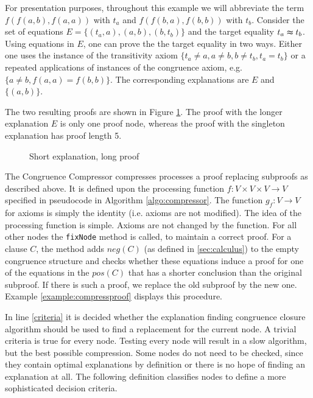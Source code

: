
\begin{example}
\label{example:shortexpl}
For presentation purposes, throughout this example we will abbreviate the term $f(f(a,b),f(a,a))$ with $t_a$ and $f(f(b,a),f(b,b))$ with $t_b$.
Consider the set of equations $E = \{(t_a,a),(a,b),(b,t_b)\}$ and the target equality $t_a \thickapprox t_b$.
Using equations in $E$, one can prove the the target equality in two ways.
Either one uses the instance of the transitivity axiom $\{t_a \neq a, a \neq b, b \neq t_b, t_a = t_b\}$ or a repeated applications of instances of the congruence axiom, e.g. $\{a \neq b, f(a,a) = f(b,b)\}$.
The corresponding explanations are $E$ and $\{(a,b)\}$.

The two resulting proofs are shown in Figure \ref{fig:short_expl_proof}.
The proof with the longer explanation $E$ is only one proof node, whereas the proof with the singleton explanation has proof length 5.

\begin{figure}[!h]

\caption{Short explanation, long proof}
\label{fig:short_expl_proof}
\end{figure}

\end{example}

The Congruence Compressor compresses processes a proof replacing subproofs as described above. 
It is defined upon the processing function $f: V \times V \times V \rightarrow V$ specified in pseudocode in Algorithm \ref{algo:compressor}.
The function $g_f: V \rightarrow V$ for axioms is simply the identity (i.e. axioms are not modified).
The idea of the processing function is simple.
Axioms are not changed by the function.
For all other nodes the \texttt{fixNode} method is called, to maintain a correct proof.
For a clause $C$, the method adds $neg(C)$ (as defined in \ref{sec:calculus}) to the empty congruence structure and checks whether these equations induce a proof for one of the equations in the $pos(C)$ that has a shorter conclusion than the original subproof.
If there is such a proof, we replace the old subproof by the new one.
Example \ref{example:compressproof} displays this procedure.

In line \ref{criteria} it is decided whether the explanation finding congruence closure algorithm should be used to find a replacement for the current node.
A trivial criteria is true for every node.
Testing every node will result in a slow algorithm, but the best possible compression.
Some nodes do not need to be checked, since they contain optimal explanations by definition or there is no hope of finding an explanation at all.
The following definition classifies nodes to define a more sophisticated decision criteria.


